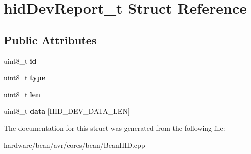 \hypertarget{structhid_dev_report__t}{}\section{hid\+Dev\+Report\+\_\+t Struct Reference}
\label{structhid_dev_report__t}
\subsection*{Public Attributes}
\begin{DoxyCompactItemize}
\item 
\hypertarget{structhid_dev_report__t_ad0f4311cc1c4edfbc0b785b12413e4c1}{}uint8\+\_\+t {\bfseries id}\label{structhid_dev_report__t_ad0f4311cc1c4edfbc0b785b12413e4c1}

\item 
\hypertarget{structhid_dev_report__t_a21effff7ec56a7bc87abe9bc9a985505}{}uint8\+\_\+t {\bfseries type}\label{structhid_dev_report__t_a21effff7ec56a7bc87abe9bc9a985505}

\item 
\hypertarget{structhid_dev_report__t_a3395346b8542076ab4907c670497fb57}{}uint8\+\_\+t {\bfseries len}\label{structhid_dev_report__t_a3395346b8542076ab4907c670497fb57}

\item 
\hypertarget{structhid_dev_report__t_a39cada450192cd0053941de4ce70b1aa}{}uint8\+\_\+t {\bfseries data} \mbox{[}H\+I\+D\+\_\+\+D\+E\+V\+\_\+\+D\+A\+T\+A\+\_\+\+L\+E\+N\mbox{]}\label{structhid_dev_report__t_a39cada450192cd0053941de4ce70b1aa}

\end{DoxyCompactItemize}


The documentation for this struct was generated from the following file\+:\begin{DoxyCompactItemize}
\item 
hardware/bean/avr/cores/bean/Bean\+H\+I\+D.\+cpp\end{DoxyCompactItemize}
